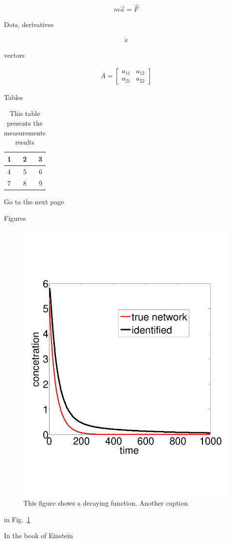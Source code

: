 \documentclass[a4paper]{article}
\begin{document}
\begin{align}
m\vec{a}=\vec{F}
\end{align}

Dots, derivatives

\begin{align}
\ddot{x}
\end{align}

vectors

\begin{align}
A= \begin{bmatrix} a_{11} & a_{12} \\ a_{21} & a_{22} \end{bmatrix}
\end{align}


Tables


\begin{table}[H]
\begin{center}
  \begin{tabular}{ | l ||| c || r ||}
    \hline
    1 & 2 & 3 \\ \hline
    4 & 5 & 6 \\ \hline 
    7 & 8 & 9 \\
    \hline
  \end{tabular}
\end{center}
\caption{This table presents the measurements results}
\label{Table1}
\end{table}

Go to the next page 

\newpage
Figures

\begin{figure}[H]
\centering
\includegraphics[scale=0.3]{fig2}
\caption{This figure shows a decaying function. Another caption}
\label{label_fig}
\end{figure}

in Fig.~\ref{label_fig}

In the book of Einstein  \cite{einstein1979general}





\end{document}
